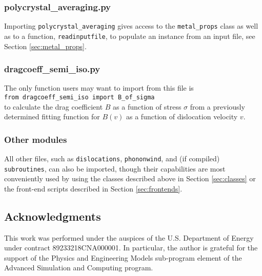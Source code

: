\documentclass[11pt,letterpaper,oneside,pdftex]{article}
\begin{document}
\subsubsection{polycrystal\_averaging.py}

Importing \verb|polycrystal_averaging| gives access to the \verb|metal_props| class as well as to a function, \verb|readinputfile|, to populate an instance from an input file, see Section \ref{sec:metal_props}.


\subsubsection{dragcoeff\_semi\_iso.py}

The only function users may want to import from this file is
\\\verb|from dragcoeff_semi_iso import B_of_sigma|\\
to calculate the drag coefficient $B$ as a function of stress $\sigma$ from a previously determined fitting function for $B(v)$ as a function of dislocation velocity $v$.


\subsubsection{Other modules}

All other files, such as \verb|dislocations|, \verb|phononwind|, and (if compiled) \verb|subroutines|, can also be imported, though their capabilities are most conveniently used by using the classes described above in Section \ref{sec:classes} or the front-end scripts described in Section \ref{sec:frontends}.



\subsection*{Acknowledgments}

This work was performed under the auspices of the U.S. Department of Energy under contract 89233218CNA000001.
In particular, the author is grateful for the support of the Physics and Engineering Models sub-program element of the Advanced Simulation and Computing program.


\printbibliography
\end{document}
